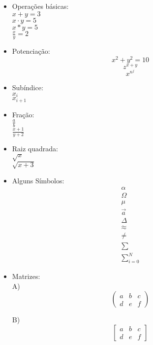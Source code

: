 \documentclass[12pt]{article}
\begin{document}
\begin{itemize}
    \item Operações básicas: \\
    $x + y = 3$ \\
    $x \cdot y = 5$ \\
    $x * y = 5$ \\
    $\frac{x}{y} = 2$

    \medskip

    \item Potenciação:
    \[
    x^2 + y^2 = 10
    \]
    \[
    z^{x+y}
    \]
    \[
    x^{n^j}
    \]

    \medskip

    \item Subíndice: \\
    $x_i$ \\
    $x_{i+1}$

    \medskip

    \item Fração: \\
    $\frac{a}{b}$ \\
    $\frac{x+1}{y+2}$

    \medskip

    \item Raiz quadrada: \\
    $\sqrt{x}$ \\
    $\sqrt{x+3}$

    \medskip

    \item Alguns Símbolos:
    \[
    \begin{array}{c}
    \alpha \\
    \Omega \\
    \mu \\
    \vec{a} \\
    \Delta \\
    \approx \\
    \neq \\
    \sum \\
    \sum_{i=0}^{N}
    \end{array}
    \]

    \medskip

    \item Matrizes: \\
    A)
    \[
    \begin{pmatrix}
        a & b & c\\
        d & e & f
    \end{pmatrix}
    \]
    
    \medskip

    B)
    \[
    \begin{bmatrix}
        a & b & c\\
        d & e & f
    \end{bmatrix}
    \]
\end{itemize}
\end{document}

